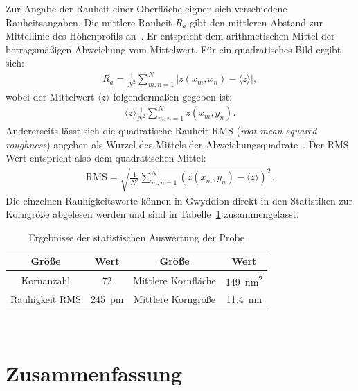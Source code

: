 \documentclass[a4paper,twoside,final]{article}
\begin{document}
Zur Angabe der Rauheit einer Oberfläche eignen sich verschiedene Rauheitsangaben. Die mittlere Rauheit $R_a$ gibt den mittleren Abstand zur Mittellinie des Höhenprofils an~\cite{Rauheit}. Er entspricht dem arithmetischen Mittel der betragsmäßigen Abweichung vom Mittelwert. Für ein quadratisches Bild ergibt sich:
\begin{align}
  R_a = \frac{1}{N^2} \sum_{m,n = 1}^N |z(x_m, x_n) - \langle z \rangle|,
\end{align}
wobei der Mittelwert $\langle z \rangle$ folgendermaßen gegeben ist:
\begin{align}
  \langle z \rangle \frac{1}{N^2} \sum_{m,n = 1}^N z(x_m, y_n).
\end{align}
Andererseits lässt sich die quadratische Rauheit RMS (\textit{root-mean-squared roughness}) angeben als Wurzel des Mittels der Abweichungsquadrate~\cite{Rauheit}.
Der RMS Wert entspricht also dem quadratischen Mittel:
\begin{align}
  \text{RMS} = \sqrt{\frac{1}{N^2}\sum_{m,n = 1}^N (z(x_m, y_n)-\langle z\rangle)^2}.
\end{align}
Die einzelnen Rauhigkeitswerte können in Gwyddion direkt in den Statistiken zur Korngröße abgelesen werden und sind in Tabelle~\ref{tab:ErgebnisseGoldprobe} zusammengefasst.
\begin{table}[ht]
	\centering
	\caption{Ergebnisse der statistischen Auswertung der Probe}
	\label{tab:ErgebnisseGoldprobe}
  \begin{tabular}{c c c c}
   \toprule
   Größe & Wert & Größe & Wert\\
   \midrule
   Kornanzahl & 72 & Mittlere Kornfläche & \SI{149}{\nano\metre\squared}\\
   Rauhigkeit RMS & \SI{245}{\pico\metre} & Mittlere Korngröße & \SI{11.4}{\nano\metre}\\
   \bottomrule
  \end{tabular}
\end{table}\\

\section{Zusammenfassung}
\end{document}
